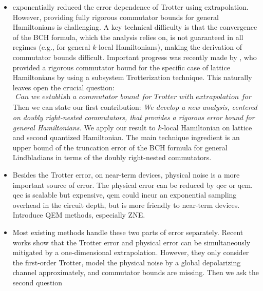 \documentclass[11pt]{article}
\begin{document}
\begin{itemize}
{The first explicit quantum simulation algorithm was proposed by Lloyd using product formulas, and then numerous advanced techniques have been extensively developed, including linear combination of unitaries (LCU), quantum signal processing (QSP), and qubitization. Despite the inferior cost dependence in time $t$ and precision $\epsilon$, the product formula enjoys commutator scaling and does not require ancillary qubits or complex controlled gates, enabling its implementation on near-term quantum devices. }
    \item \citet{watson2025exponentially} exponentially reduced the error dependence of Trotter using extrapolation. However, providing fully rigorous commutator bounds for general Hamiltonians is challenging. A key technical difficulty is that the convergence of the BCH formula, which the analysis relies on, is not guaranteed in all regimes (e.g., for general $k$-local Hamiltonians), making the derivation of commutator bounds difficult. Important progress was recently made by \citet{mizuta2025commutator}, who provided a rigorous commutator bound for the specific case of lattice Hamiltonians by using a subsystem Trotterization technique. This naturally leaves open the crucial question: \begin{align*}
        \textit{Can we establish a commutator bound for Trotter with extrapolation for general Hamiltonians? }
    \end{align*}  Then we can state our first contribution: \emph{We develop a new analysis, centered on doubly right-nested commutators, that provides a rigorous error bound for general Hamiltonians.} We apply our result to $k$-local Hamiltonian on lattice and second quantized Hamiltonian. The main technique ingredient is an upper bound of the truncation error of the BCH formula for general Lindbladians in terms of the doubly right-nested commutators.
    \item Besides the Trotter error, on near-term devices, physical noise is a more important source of error. The physical error can be reduced by qec or qem. qec is scalable but expensive, qem could incur an exponential sampling overhead in the circuit depth, but is more friendly to near-term devices. Introduce QEM methods, especially ZNE. 
    \item Most existing methods handle these two parts of error separately. Recent works show that the Trotter error and physical error can be simultaneously mitigated by a one-dimensional extrapolation. However, they only consider the first-order Trotter, model the physical noise by a global depolarizing channel approximately, and commutator bounds are missing. Then we ask the second question \begin{align*}

\end{align*}
\end{itemize}
\end{document}
